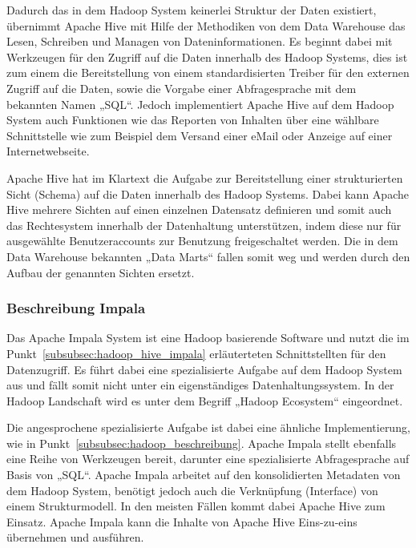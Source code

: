 Dadurch das in dem Hadoop System keinerlei Struktur der Daten existiert,
übernimmt Apache Hive mit Hilfe der Methodiken von dem Data Warehouse das
Lesen, Schreiben und Managen von Dateninformationen. Es beginnt dabei mit
Werkzeugen für den Zugriff auf die Daten innerhalb des Hadoop Systems, dies ist
zum einem die Bereitstellung von einem standardisierten Treiber für den
externen Zugriff auf die Daten, sowie die Vorgabe einer Abfragesprache mit dem
bekannten Namen „SQL“. Jedoch implementiert Apache Hive auf dem Hadoop System
auch Funktionen wie das Reporten von Inhalten über eine wählbare Schnittstelle
wie zum Beispiel dem Versand einer eMail oder Anzeige auf einer
Internetwebseite.

Apache Hive hat im Klartext die Aufgabe zur Bereitstellung einer strukturierten
Sicht (Schema) auf die Daten innerhalb des Hadoop Systems. Dabei kann Apache
Hive mehrere Sichten auf einen einzelnen Datensatz definieren und somit auch
das  Rechtesystem innerhalb der Datenhaltung unterstützen, indem diese nur
für ausgewählte Benutzeraccounts zur Benutzung freigeschaltet werden. Die in
dem Data Warehouse bekannten „Data Marts“ fallen somit weg und werden durch
den Aufbau der genannten Sichten ersetzt.
\nl%

\subsubsection{Beschreibung Impala}
\label{subsubsec:impala_beschreibung}
Das Apache Impala System ist eine Hadoop basierende Software und nutzt die
im Punkt~\ref{subsubsec:hadoop_hive_impala} erläuterteten Schnittstellten
für den Datenzugriff. Es führt dabei eine spezialisierte Aufgabe auf dem
Hadoop System aus und fällt somit nicht unter ein eigenständiges
Datenhaltungssystem. In der Hadoop Landschaft wird es unter dem Begriff
„Hadoop Ecosystem“ eingeordnet.

Die angesprochene spezialisierte Aufgabe ist dabei eine ähnliche
Implementierung, wie in Punkt~\ref{subsubsec:hadoop_beschreibung}. Apache
Impala stellt ebenfalls eine Reihe von Werkzeugen bereit, darunter eine
spezialisierte Abfragesprache auf Basis von „SQL“. Apache Impala arbeitet auf
den konsolidierten Metadaten von dem Hadoop System, benötigt jedoch auch die
Verknüpfung (Interface) von einem Strukturmodell. In den meisten Fällen kommt
dabei Apache Hive zum Einsatz. Apache Impala kann die Inhalte von Apache Hive
Eins-zu-eins übernehmen und ausführen.

